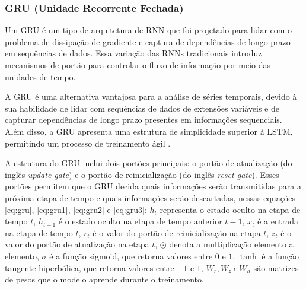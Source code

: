 \subsubsection{GRU (Unidade Recorrente Fechada)}


Um GRU é um tipo de arquitetura de RNN que foi projetado para lidar com o problema de dissipação de gradiente e captura de dependências de longo prazo em sequências de dados. Essa variação das RNNs tradicionais introduz mecanismos de portão para controlar o fluxo de informação por meio das unidades de tempo.

A GRU é uma alternativa vantajosa para a análise de séries temporais, devido à sua habilidade de lidar com sequências de dados de extensões variáveis e de capturar dependências de longo prazo presentes em informações sequenciais. Além disso, a GRU apresenta uma estrutura de simplicidade superior à LSTM, permitindo um processo de treinamento ágil  \cite{mastersthesis53fd58a7}.

A estrutura do GRU inclui dois portões principais: o portão de atualização (do inglês \textit{update gate}) e o portão de reinicialização (do inglês \textit{reset gate}). Esses portões permitem que o GRU decida quais informações serão transmitidas para a próxima etapa de tempo e quais informações serão descartadas,
nessas equações \eqref{eq:gru}, \eqref{eq:gru1}, \eqref{eq:gru2} e \eqref{eq:gru3}:
\( h_t \) representa o estado oculto na etapa de tempo \( t \), \( h_{t-1} \) é o estado oculto na etapa de tempo anterior \( t-1 \), \( x_t \) é a entrada na etapa de tempo \( t \), \( r_t \) é o valor do portão de reinicialização na etapa \( t \), \( z_t \) é o valor do portão de atualização na etapa \( t \), \( \odot \) denota a multiplicação elemento a elemento, \( \sigma \) é a função sigmoid, que retorna valores entre $0$ e $1$, \( \tanh \) é a função tangente hiperbólica, que retorna valores entre $-1$ e $1$, \( W_r, W_z\ e\ W_h \) são matrizes de pesos que o modelo aprende durante o treinamento.

